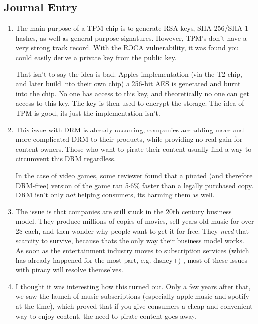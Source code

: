 \documentclass{scrartcl}
\begin{document}
\subsection{Journal Entry}
\label{sec:orgac6b67b}
\begin{enumerate}
\item The main purpose of a TPM chip is to generate RSA keys, SHA-256/SHA-1 hashes,
as well as general purpose signatures. However, TPM's don't have a very
strong track record. With the ROCA vulnerability, it was found you could
easily derive a private key from the public key.

That isn't to say the idea is bad. Apples implementation (via the T2 chip,
and later build into their own chip) a 256-bit AES is generated and burnt
into the chip. No one has access to this key, and theoretically no one can
get access to this key. The key is then used to encrypt the storage. The idea
of TPM is good, its just the implementation isn't.

\item This issue with DRM is already occurring, companies are adding more and more
complicated DRM to their products, while providing no real gain for content
owners. Those who want to pirate their content usually find a way to
circumvent this DRM regardless.

In the case of video games, some reviewer
found that a pirated (and therefore DRM-free) version of the game ran 5-6\%
faster than a legally purchased copy. DRM isn't only \emph{not} helping consumers,
its harming them as well.

\item The issue is that companies are still stuck in the 20th century business
model. They produce millions of copies of movies, sell years old music for
over 2\$ each, and then wonder why people want to get it for free. They \emph{need}
that scarcity to survive, because thats the only way their business model
works. As soon as the entertainment industry moves to subscription services
(which has already happened for the most part, e.g. disney+) , most of these
issues with piracy will resolve themselves.

\item I thought it was interesting how this turned out. Only a few years after
that, we saw the launch of music subscriptions (especially apple music and
spotify at the time), which proved that if you give consumers a cheap and
convenient way to enjoy content, the need to pirate content goes away.
\end{enumerate}
\end{document}
